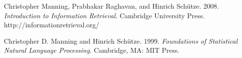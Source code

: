\documentclass[11pt,letterpaper]{article}
\def\url#1{{\small\sf #1}}
\begin{document}
\begin{vita}
\begin{Products (most closely related)}



\end{Products (most closely related)}


\begin{Products (other significant)}

\item Christopher Manning, Prabhakar Raghavan, and Hinrich Sch\"utze. 2008. \emph{Introduction to Information Retrieval}.  Cambridge University Press.
\url{http://informationretrieval.org/}

\item Christopher D. Manning and Hinrich Sch\"utze. 1999. {\em Foundations
of Statistical Natural Language Processing}.  Cambridge, MA: MIT Press.





\end{Products (other significant)}
\end{vita}
\end{document}

